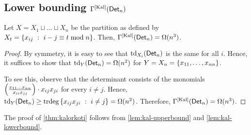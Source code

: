 \subsection{Lower bounding $\Gamma^{\mathrm{[Kal]}}(\mathsf{Det}_n)$}


\begin{lemma}\label{lem:kal-lowerbound}
  Let $X = X_1 \sqcup \dots \sqcup X_n$ be the partition as defined by
  $X_t = \left\{{x_{ij}}\ : \ {i-j\equiv t\bmod{n}}\right\}$. 
Then,
  $\Gamma^{\mathrm{[Kal]}}(\mathsf{Det}_n) = \Omega(n^3)$.
\end{lemma}
\begin{proof}
  By symmetry, it is easy to see that $\text{td}_{X_i}(\mathsf{Det}_n)$ is
  the same for all $i$. 
Hence, it suffices to show that
  $\text{td}_{Y}(\mathsf{Det}_n) = \Omega(n^2)$ for $Y = X_n = \left\{x_{11},\dots, x_{nn}\right\}$. 

  To see this, observe that the determinant consists of the monomials
  $\left(\frac{x_{11}\dots x_{nn}}{x_{ii}x_{jj}}\right)\cdot
  x_{ij}x_{ji}$ for every $i\neq j$. 
Hence, $\text{td}_{Y}(\mathsf{Det}_n)
  \geq \mathrm{trdeg}\left\{{x_{ij}x_{ji}}\ : \ {i\neq j}\right\} =
  \Omega(n^2)$. 
Therefore, $\Gamma^{\mathrm{[Kal]}}(\mathsf{Det}_n) =
  \Omega(n^3)$.
\end{proof}

The proof of \autoref{thm:kalorkoti} follows from
\autoref{lem:kal-upperbound} and \autoref{lem:kal-lowerbound}.



